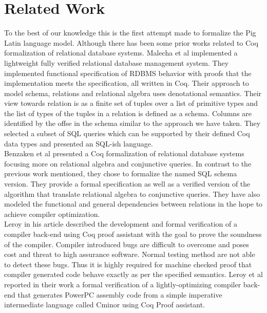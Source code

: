 \section{Related Work}
\label{sec:related}

To the best of our knowledge this is the first attempt made to formalize the Pig Latin language model. Although there has been some prior works related to Coq formalization of relational database systems. Malecha et al\cite{malecha2010rdbms} implemented a lightweight fully verified relational database management system. They implemented functional specification of RDBMS behavior with proofs that the implementation meets the specification, all written in Coq. Their approach to model schema, relations and relational algebra uses denotational semantics. Their view towards relation is as a finite set of tuples over a list of primitive types and the list of types of the tuples in a relation is defined as a schema. Columns are identified by the offse in the schema similar to the approach we have taken. They selected a subset of SQL queries which can be supported by their defined Coq data types and presented an SQL-ish language. \\ 
Benzaken et al \cite{Benzaken2014} presented a Coq formalization of relational database systems focusing more on relational algebra and conjunctive queries. In contrast to the previous work mentioned, they chose to formalize the named SQL schema version. They provide a formal specification as well as a verified version of the algorithm that translate relational algebra to conjunctive queries. They have also modeled the functional and general dependencies between relations in the hope to achieve compiler optimization. \\
Leroy \cite{leroy2009formally} in his article described the development and formal verification of a compiler back-end using Coq proof assistant with the goal to prove the soundness of the compiler. Compiler introduced bugs are difficult to overcome and poses cost and threat to high assurance software. Normal testing method are not able to detect these bugs. Thus it is highly required for machine checked proof that compiler generated code behave exactly as per the specified semantics. Leroy et al reported in their work a formal verification of a lightly-optimizing compiler back-end that generates PowerPC assembly
code from a simple imperative intermediate language called Cminor using Coq Proof assistant.


